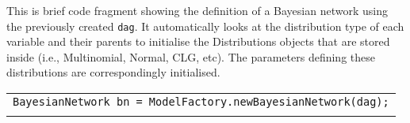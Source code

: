 This is brief code fragment showing the definition of a Bayesian network using the previously created \texttt{dag}. It automatically looks at the distribution type of each variable and their parents to initialise the Distributions objects that are stored inside (i.e., Multinomial, Normal, CLG, etc). The parameters defining these distributions are correspondingly initialised.

\begin{table}[H]
\begin{tabular}{l} \hline

        \texttt{BayesianNetwork bn = ModelFactory.newBayesianNetwork(dag);}\\ \\ \hline

\end{tabular}
\end{table}        